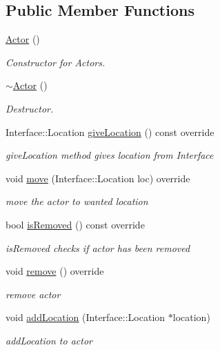 \subsection*{Public Member Functions}
\begin{DoxyCompactItemize}
\item 
\hyperlink{class_student_side_1_1_actor_a975c8c762266aaa7a77bd66fc4ec52f8}{Actor} ()
\begin{DoxyCompactList}\small\item\em Constructor for Actors. \end{DoxyCompactList}\item 
\hyperlink{class_student_side_1_1_actor_ae5f1f32ef2603cff6d9f91648ad723df}{$\sim$\-Actor} ()
\begin{DoxyCompactList}\small\item\em Destructor. \end{DoxyCompactList}\item 
Interface\-::\-Location \hyperlink{class_student_side_1_1_actor_a7da7be8bf80fd2cb6ecccb5643c5550b}{give\-Location} () const override
\begin{DoxyCompactList}\small\item\em give\-Location method gives location from Interface \end{DoxyCompactList}\item 
void \hyperlink{class_student_side_1_1_actor_ac3027790dbf5d48a783931a39876b16f}{move} (Interface\-::\-Location loc) override
\begin{DoxyCompactList}\small\item\em move the actor to wanted location \end{DoxyCompactList}\item 
bool \hyperlink{class_student_side_1_1_actor_ae43895e750efd94a11ed0377de1541a2}{is\-Removed} () const override
\begin{DoxyCompactList}\small\item\em is\-Removed checks if actor has been removed \end{DoxyCompactList}\item 
void \hyperlink{class_student_side_1_1_actor_ac5be31d931bf28cfd9044c991ea7ad18}{remove} () override
\begin{DoxyCompactList}\small\item\em remove actor \end{DoxyCompactList}\item 
void \hyperlink{class_student_side_1_1_actor_a9e2ebb8ad1118556222cb153e9a4cd3e}{add\-Location} (Interface\-::\-Location $\ast$location)
\begin{DoxyCompactList}\small\item\em add\-Location to actor \end{DoxyCompactList}\end{DoxyCompactItemize}



